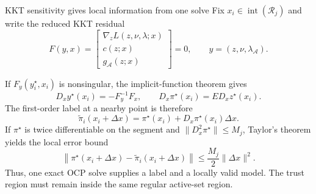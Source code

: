 \documentclass[aspectratio=169,10pt]{beamer}
\begin{document}
\begin{frame}{KKT sensitivity gives local information from one solve}
\small
Fix $x_i\in\operatorname{int}(\mathcal R_j)$ and write the reduced KKT residual
\[
F(y,x)=
\begin{bmatrix}
\nabla_z L(z,\nu,\lambda;x)\\ c(z;x)\\ g_{\mathcal A}(z;x)
\end{bmatrix}=0,
\qquad y=(z,\nu,\lambda_{\mathcal A}).
\]

If $F_y(y_i^\star,x_i)$ is nonsingular, the implicit-function theorem gives
\[
  D_xy^\star(x_i)=-F_y^{-1}F_x,
  \qquad
  D_x\pi^\star(x_i)=E D_xz^\star(x_i).
\]
The first-order label at a nearby point is therefore
\[
  \widetilde\pi_i(x_i+\Delta x)
  =\pi^\star(x_i)+D_x\pi^\star(x_i)\Delta x.
\]
If $\pi^\star$ is twice differentiable on the segment and $\|D_x^2\pi^\star\|\le M_j$, Taylor's theorem yields the local error bound
\[
  \left\|\pi^\star(x_i+\Delta x)-\widetilde\pi_i(x_i+\Delta x)\right\|
  \le \frac{M_j}{2}\|\Delta x\|^2.
\]
\color{Slate}\small Thus, one exact OCP solve supplies a label and a locally valid model. The trust region must remain inside the same regular active-set region.

\end{frame}
\end{document}
